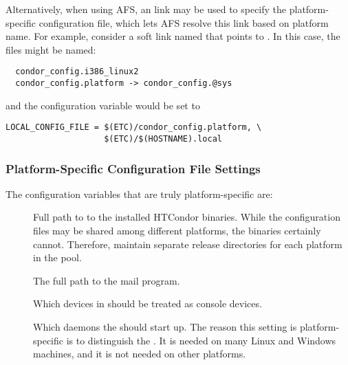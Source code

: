 Alternatively, when using AFS, an  link may be used to
specify the platform-specific configuration file,
which lets AFS resolve this link based on platform name.
For example, consider
a soft link named  that points to
.  In this case, the files might be named:

\begin{verbatim}
  condor_config.i386_linux2
  condor_config.platform -> condor_config.@sys
\end{verbatim}

and the  configuration variable would be set to

\footnotesize
\begin{verbatim}
LOCAL_CONFIG_FILE = $(ETC)/condor_config.platform, \
                    $(ETC)/$(HOSTNAME).local
\end{verbatim}
\normalsize

\subsubsection{\label{sec:Platform-Specific-Settings}Platform-Specific
Configuration File Settings}

The configuration variables that are truly platform-specific are:

\begin{description}

\item[] Full path to to the installed
  HTCondor binaries.  While the configuration files may be shared among
  different platforms, the binaries certainly cannot.  Therefore,
  maintain separate release directories for each platform
  in the pool.  

\item[] The full path to the mail program.  

\item[] Which devices in  should be
  treated as console devices.

\item[] Which daemons the  should
  start up.  The reason this setting is platform-specific is
  to distinguish the .
  It is needed on many Linux and Windows machines,
  and it is not needed on other platforms.

\end{description}

